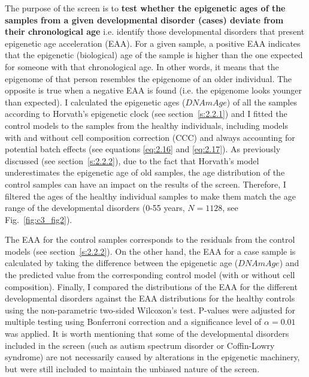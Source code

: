 \bigskip

The purpose of the screen is to \textbf{test whether the epigenetic ages of the samples from a given developmental disorder (cases) deviate from their chronological age} i.e. identify those developmental disorders that present epigenetic age acceleration (EAA). For a given sample, a positive EAA indicates that the epigenetic (biological) age of the sample is higher than the one expected for someone with that chronological age. In other words, it means that the epigenome of that person resembles the epigenome of an older individual. The opposite is true when a negative EAA is found (i.e. the epigenome looks younger than expected). I calculated the epigenetic ages ($DNAmAge$) of all the samples according to Horvath's epigenetic clock (see section~\ref{s:2.2.1}) and I fitted the control models to the samples from the healthy individuals, including models with and without cell composition correction (CCC) and always accounting for potential batch effects (see equations \ref{eq:2.16} and \ref{eq:2.17}).  As previously discussed (see section~\ref{s:2.2.2}), due to the fact that Horvath's model underestimates the epigenetic age of old samples, the age distribution of the control samples can have an impact on the results of the screen. Therefore, I filtered the ages of the healthy individual samples to make them match the age range of the developmental disorders (0-55 years, $N = 1128$, see Fig.~\ref{fig:c3_fig2}).

\bigskip

The EAA for the control samples corresponds to the residuals from the control models (see section~\ref{s:2.2.2}). On the other hand, the EAA for a case sample is calculated by taking the difference between the epigenetic age ($DNAmAge$) and the predicted value from the corresponding control model (with or without cell composition). Finally, I compared the distributions of the EAA for the different developmental disorders against the EAA distributions for the healthy controls using the non-parametric two-sided Wilcoxon's test. P-values were adjusted for multiple testing using Bonferroni correction and a significance level of $\alpha = 0.01$ was applied. It is worth mentioning that some of the developmental disorders included in the screen (such as autism spectrum disorder or Coffin-Lowry syndrome) are not necessarily caused by alterations in the epigenetic machinery, but were still included to maintain the unbiased nature of the screen. 

\smallskip

